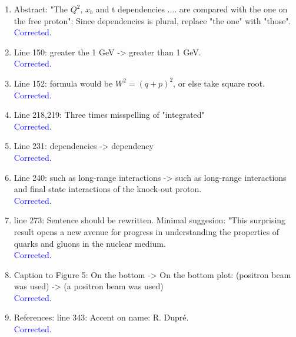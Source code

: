 \documentclass[a4paper,11pt,twoside]{article}
\begin{document}
\begin{enumerate}

\item  Abstract: "The $Q^2$, $x_b$ and t dependencies .... are compared with 
   the one on the free proton": Since dependencies is plural, replace "the one"
      with "those".\\
   \textcolor{blue}{Corrected.}


\item  Line 150: greater the 1 GeV -> greater than 1 GeV.\\
   \textcolor{blue}{Corrected.}


\item  Line 152: formula would be $W^2 = (q+p)^2$, or else take square root.\\
   \textcolor{blue}{Corrected.}

   
\item  Line 218,219:  Three times misspelling of "integrated"\\
   \textcolor{blue}{Corrected.}

   
\item  Line 231: dependencies -> dependency\\
   \textcolor{blue}{Corrected.}

   
\item  Line 240: such as long-range interactions -> such as long-range 
   interactions and final state interactions of the knock-out proton.\\
   \textcolor{blue}{Corrected.}

\item  line 273: Sentence should be rewritten. Minimal suggesion:
"This surprising result opens a new avenue for progress in understanding the 
      properties of quarks and gluons in the nuclear medium.\\
   \textcolor{blue}{Corrected.}


\item  Caption to Figure 5: On the bottom -> On the bottom plot:
(positron beam was used) -> (a positron beam was used)\\
   \textcolor{blue}{Corrected.}


\item  References: line 343:  Accent on name:  R. Dupr\'{e}.\\
   \textcolor{blue}{Corrected.}

   

  
\end{enumerate}
\end{document}
